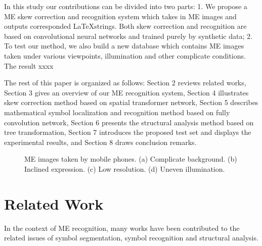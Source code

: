 \documentclass[10pt,conference,a4paper]{IEEEtran}
\begin{document}
	In this study our contributions can be divided into two parts: 1. We propose a ME skew correction and recognition system which takes in ME images and outputs corresponded \LaTeX strings. Both skew correction and recognition are based on convolutional neural networks and trained purely by synthetic data; 2. To test our method, we also build a new database which contains ME images taken under various viewpoints, illumination and other complicate conditions. The result xxxx
	
	The rest of this paper is organized as follows: Section 2 reviews related works, Section 3 gives an overview of our ME recognition system, Section 4 illustrates skew correction method based on spatial transformer network, Section 5 describes mathematical symbol localization and recognition method based on fully convolution network, Section 6 presents the structural analysis method based on tree transformation, Section 7 introduces the proposed test set and displays the experimental results, and Section 8 draws conclusion remarks.
	
	
	\begin{figure}
		\centering
		\caption{ME images taken by mobile phones. (a) Complicate background. (b) Inclined expression. (c) Low resolution. (d) Uneven illumination.}
	\end{figure}
	
	\section{Related Work}
	In the context of ME recognition, many works have been contributed to the related issues of symbol segmentation, symbol recognition and structural analysis.
	
\end{document}
